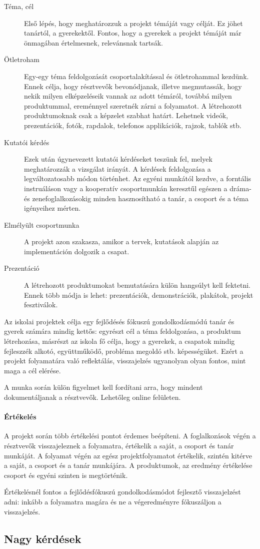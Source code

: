 \begin{description}
  \item[Téma, cél] Első lépés, hogy meghatározzuk a projekt témáját vagy célját. Ez jöhet tanártól, a gyerekektől. Fontos, hogy a gyerekek a projekt témáját már önmagában értelmesnek, relevánsnak tartsák.

  \item [Ötletroham]  Egy-egy téma feldolgozását csoportalakítással és ötletrohammal kezdünk. Ennek célja, hogy résztvevők bevonódjanak, illetve megmutassák, hogy nekik milyen elképzeléseik vannak az adott témáról, továbbá milyen produktummal, ereménnyel szeretnék zárni a folyamatot. A létrehozott produktumoknak csak a képzelet szabhat határt. Lehetnek videók, prezentációk, fotók, rapdalok, telefonos applikációk, rajzok, tablók stb.

  \item [Kutatói kérdés] Ezek után úgynevezett kutatói kérdéseket teszünk fel, melyek meghatározzák a vizsgálat irányát. A kérdések feldolgozása a legváltozatosabb módon történhet. Az egyéni munkától kezdve, a forntális instruáláson vagy a kooperatív csoportmunkán keresztűl egészen a dráma- és zenefoglalkozásokig minden hasznosítható a tanár, a csoport és a téma igényeihez mérten.
  \item [Elmélyült csoportmunka] A projekt azon szakasza, amikor a tervek, kutatások alapján az implementáción dolgozik a csapat.
  \item [Prezentáció] A létrehozott produktumokat bemutatására külön hangsúlyt kell fektetni. Ennek több módja is lehet: prezentációk, demonstrációk, plakátok, projekt fesztiválok.
\end{description}

Az iskolai projektek célja egy fejlődésés fókuszú gondolkodásmódú tanár és gyerek számára mindig kettős: egyrészt cél a téma feldolgozása, a produktum létrehozása, másrészt az iskola fő célja, hogy a gyerekek, a csapatok mindig fejleszzék alkotó, együttműködő, probléma megoldó stb. képességüket. Ezért a projekt folyamatára való reflektálás, visszajelzés ugyanolyan olyan fontos, mint maga a cél elérése.

A munka során külön figyelmet kell fordítani arra, hogy mindent dokumentáljanak a résztvevők. Lehetőleg online felületen.
\paragraph{Értékelés} A projekt során több értékelési pontot érdemes beépíteni. A foglalkozások végén a résztvevők visszajeleznek a folyamatra, értékelik a saját, a csoport és tanár munkáját. A folyamat végén az egész projektfolyamatot értékelik, szintén kitérve a saját, a csoport és a tanár munkájára. A produktumok, az eredmény értékelése csoport és egyéni szinten is megtörténik.

Értékelésnél fontos a fejlődésfókuszú gondolkodásmódot fejlesztő visszajelzést adni: inkább a folyamatra magára és ne a végeredményre fókuszáljon a visszajelzés.

\subsection{Nagy kérdések}
